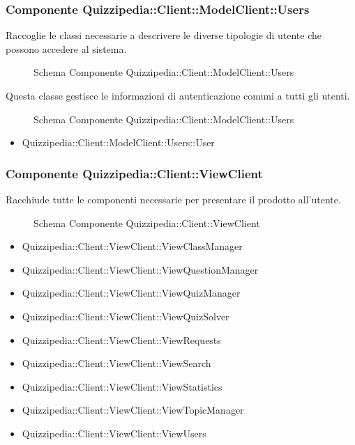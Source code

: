 \subsubsection{Componente Quizzipedia::Client::ModelClient::Users}
Raccoglie le classi necessarie a descrivere le diverse tipologie di utente che possono accedere al sistema.
\begin{figure}[H]
\centering
\noindent{}
\caption{Schema Componente Quizzipedia::Client::ModelClient::Users}
\end{figure}
Questa classe gestisce le informazioni di autenticazione comuni a tutti gli utenti.
\begin{figure}[H]
\centering
\noindent{}
\caption{Schema Componente Quizzipedia::Client::ModelClient::Users}
\end{figure}
\begin{itemize}
\item Quizzipedia::Client::ModelClient::Users::User
\end{itemize}
\subsubsection{Componente Quizzipedia::Client::ViewClient}
Racchiude tutte le componenti necessarie per presentare il prodotto all'utente.
\begin{figure}[H]
\centering
\noindent{}
\caption{Schema Componente Quizzipedia::Client::ViewClient}
\end{figure}
\begin{itemize}
\item Quizzipedia::Client::ViewClient::ViewClassManager
\item Quizzipedia::Client::ViewClient::ViewQuestionManager
\item Quizzipedia::Client::ViewClient::ViewQuizManager
\item Quizzipedia::Client::ViewClient::ViewQuizSolver
\item Quizzipedia::Client::ViewClient::ViewRequests
\item Quizzipedia::Client::ViewClient::ViewSearch
\item Quizzipedia::Client::ViewClient::ViewStatistics
\item Quizzipedia::Client::ViewClient::ViewTopicManager
\item Quizzipedia::Client::ViewClient::ViewUsers
\end{itemize}
